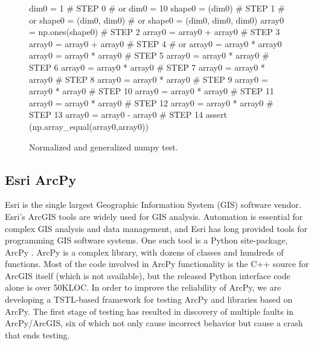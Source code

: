 \begin{figure}
{\scriptsize
\begin{code}
dim0 = 1                            \textcolor{black!60}{\# STEP 0}
\textcolor{black!60}{\#  or dim0 = 10 }
shape0 = (dim0)                     \textcolor{black!60}{\# STEP 1}
\textcolor{black!60}{\#  or shape0 = (dim0, dim0) }
\textcolor{black!60}{\#  or shape0 = (dim0, dim0, dim0) }
array0 = np.ones(shape0)            \textcolor{black!60}{\# STEP 2}
array0 = array0 + array0            \textcolor{black!60}{\# STEP 3}
array0 = array0 + array0            \textcolor{black!60}{\# STEP 4}
\textcolor{black!60}{\#  or array0 = array0 * array0 }
array0 = array0 * array0            \textcolor{black!60}{\# STEP 5}
array0 = array0 * array0            \textcolor{black!60}{\# STEP 6}
array0 = array0 * array0            \textcolor{black!60}{\# STEP 7}
array0 = array0 * array0            \textcolor{black!60}{\# STEP 8}
array0 = array0 * array0            \textcolor{black!60}{\# STEP 9}
array0 = array0 * array0            \textcolor{black!60}{\# STEP 10}
array0 = array0 * array0            \textcolor{black!60}{\# STEP 11}
array0 = array0 * array0            \textcolor{black!60}{\# STEP 12}
array0 = array0 * array0            \textcolor{black!60}{\# STEP 13}
array0 = array0 - array0            \textcolor{black!60}{\# STEP 14}
assert (np.array\_equal(array0,array0))
\end{code}
}
\caption{Normalized and generalized numpy test.}
\label{numpynormgen}
\end{figure}

\subsection{Esri ArcPy}

Esri is the single
largest Geographic Information System (GIS) software vendor.  Esri's ArcGIS tools are widely
used for GIS analysis.  Automation is essential for complex GIS analysis and
data management, and Esri has long provided tools
for programming GIS software systems.  One such tool
is a Python site-package, ArcPy \cite{ArcPy}.  ArcPy is a complex library,
with dozens of classes and hundreds of functions.  Most of the code involved in ArcPy
functionality is the C++ source for ArcGIS itself (which is not
available), but the released Python interface code alone is over 50KLOC.
In order to improve the reliability of ArcPy, we are developing a
TSTL-based framework for testing ArcPy and libraries
based on ArcPy.  The first
stage of testing has resulted in discovery of multiple faults in
ArcPy/ArcGIS, six of which not only cause incorrect behavior but cause
a crash that ends testing.  

